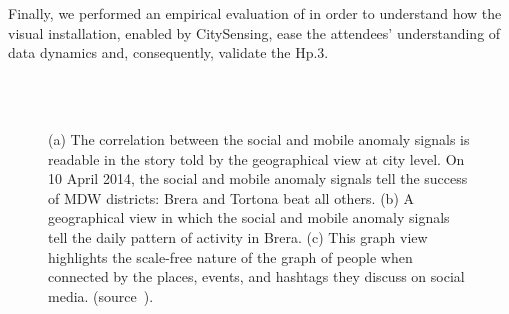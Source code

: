 Finally, we performed an empirical evaluation of \frappe{} in order to understand how the visual installation, enabled by CitySensing, ease the attendees' understanding of data dynamics and, consequently, validate the \textsf{Hp.3}. 

\begin{figure}[p]
\centering
{}\\
\\
\caption{(a) The correlation between the social and mobile anomaly signals is readable in the story told by the geographical view at city level. On 10 April 2014, the social and mobile anomaly signals tell the success of MDW districts: Brera and Tortona beat all others. (b) A geographical view in which the social and mobile anomaly signals tell the daily pattern of activity in Brera. (c) This graph view highlights the scale-free nature of the graph of people when connected by the places, events, and hashtags they discuss on social media. (source~\cite{DBLP:journals/ieeemm/BalduiniVALAC15}).}
\label{fig:eval-empirical}
\end{figure}

